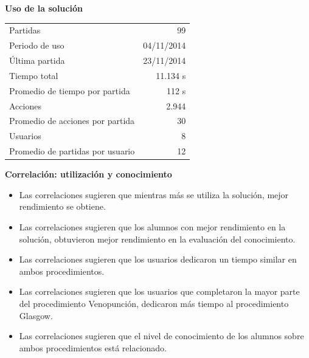 \documentclass[portrait,final,a0paper,fontscale=0.277]{baposter}
\begin{document}
\begin{poster}
{\begin{multicols}{2}
	
\textbf{Uso de la solución}
\begin{center}
    \scriptsize
\begin{tabular}{lr}
\toprule
Partidas                         & 99 \\
Periodo de uso                 & 04/11/2014 \\
Última partida                   & 23/11/2014 \\
\midrule
Tiempo total       & 11.134 s \\
Promedio de tiempo por partida   & 112 s
\\\midrule
Acciones           & 2.944 \\
Promedio de acciones por partida & 30
\\\midrule
Usuarios           & 8 \\
Promedio de partidas por usuario & 12
\\\bottomrule
\end{tabular}                                                      
\end{center}

\textbf{Correlación: utilización y conocimiento}
	

	\scriptsize 
	
	\begin{itemize}
	
	\setlength\itemsep{0em}
    \item Las correlaciones sugieren que mientras más se utiliza la
        solución, mejor rendimiento se obtiene.
    \item Las correlaciones sugieren que los alumnos con mejor rendimiento
        en la solución, obtuvieron mejor rendimiento en la evaluación del
        conocimiento.
    \item Las correlaciones sugieren que los usuarios dedicaron un tiempo
        similar en ambos procedimientos.
    \item Las correlaciones sugieren que los usuarios que completaron la
        mayor parte del procedimiento Venopunción, dedicaron más tiempo al
        procedimiento Glasgow.
    \item Las correlaciones sugieren que el nivel de conocimiento de los
        alumnos sobre ambos procedimientos está relacionado.
	\end{itemize}
		


\end{multicols}}
\end{poster}
\end{document}
